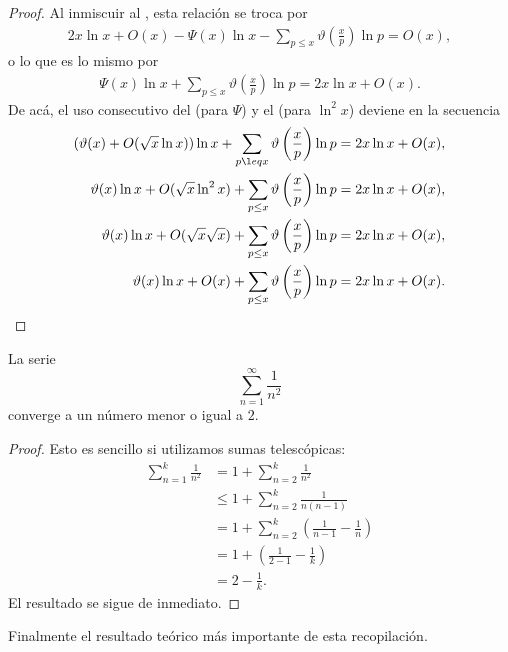 \begin{proof}
Al inmiscuir al , esta relaci\'on se troca por 
\begin{align}
2x\ln x + O(x) - \Psi(x)\ln x - \sum_{p \leq x} \vartheta\left(\frac{x}{p}\right)\ln p = O(x), 
\end{align}
o lo que es lo mismo por 
\begin{align}
\Psi(x)\ln x + \sum_{p \leq x} \vartheta\left(\frac{x}{p}\right)\ln p = 2x\ln x + O(x).
\end{align}
De ac\'a, el uso consecutivo del  (para $\Psi$) y el  (para $\ln^2 x$) deviene en la secuencia
\begin{align}
(\vartheta(x) + O(\sqrt{x}\ln x))\ln x + \sum_{p \l eq x} \vartheta\left(\frac{x}{p}\right)\ln p &= 2x\ln x + O(x), \\
\vartheta(x)\ln x + O(\sqrt{x}\ln^2 x) + \sum_{p \leq x} \vartheta\left(\frac{x}{p}\right)\ln p &= 2x\ln x + O(x), \\
\vartheta(x)\ln x + O(\sqrt{x}\sqrt{x}) + \sum_{p \leq x} \vartheta\left(\frac{x}{p}\right)\ln p &= 2x\ln x + O(x), \\
\vartheta(x)\ln x + O(x) + \sum_{p \leq x} \vartheta\left(\frac{x}{p}\right)\ln p &= 2x\ln x + O(x).
\end{align}
\end{proof}

\begin{lemma}
La serie
\[
\sum_{n = 1}^\infty \frac{1}{n ^ 2}
\]
converge a un n\'umero menor o igual a $2$. 
\end{lemma}

\begin{proof}
Esto es sencillo si utilizamos sumas telesc\'opicas: 
\begin{align}
\sum_{n = 1}^k \frac{1}{n^2} &= 1 + \sum_{n = 2}^k \frac{1}{n^2} \\
&\leq 1 + \sum_{n = 2}^k \frac{1}{n (n - 1)} \\
&= 1 + \sum_{n = 2}^k \left(\frac{1}{n - 1} - \frac{1}{n}\right) \\
&= 1 + \left(\frac{1}{2 - 1} - \frac{1}{k}\right) \\
&= 2 - \frac{1}{k}.
\end{align}
El resultado se sigue de inmediato. 
\end{proof}

Finalmente el resultado te\'orico m\'as importante de esta recopilaci\'on. 

